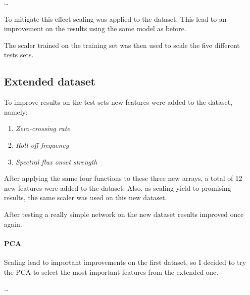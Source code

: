 \dots

To mitigate this effect scaling was applied to the dataset.
This lead to an improvement on the results using the same 
model as before. 

The scaler trained on the training set was then 
used to scale the five different tests sets.

\subsection{Extended dataset}
To improve results on the test sets new features were added 
to the dataset, namely: 
\begin{enumerate}
    \item \emph{Zero-crossing rate}
    \item \emph{Roll-off frequency}
    \item \emph{Spectral flux onset strength}
\end{enumerate}
After applying the same four functions to these three new arrays, 
a total of 12 new features were added to the dataset.
Also, as scaling yield to promising results, 
the same scaler was used on this new dataset. 

After testing a really simple network on the new dataset 
results improved once again.

\paragraph{PCA}
Scaling lead to important improvements on the first dataset, 
so I decided to try the PCA to select the most important
features from the extended one.

\dots
